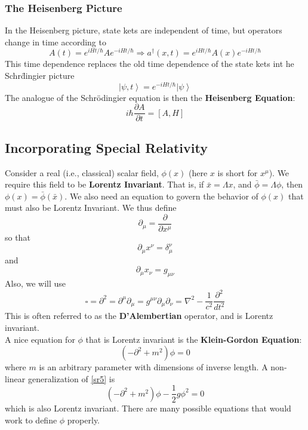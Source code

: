 \documentclass[10pt]{article}
\newcommand{\n}{\noindent}
\newcommand{\ket}[1]{\left|#1\right>}
\newcommand{\comm}[2]{\left[#1,#2\right]}
\begin{document}
	\subsubsection{The Heisenberg Picture}
	In the Heisenberg picture, state kets are independent of time, but operators change in time according to
	\begin{equation}\label{heisenberg1} A(t)=e^{iHt/\hbar}Ae^{-iHt/\hbar} \Rightarrow a^\dag(x,t)=e^{iHt/\hbar}A(x)e^{-iHt/\hbar}\end{equation}
	This time dependence replaces the old time dependence of the state kets int he Schr\"dingier picture
	\begin{equation} \label{heisenberg2}\ket{\psi,t}=e^{-i Ht/\hbar}\ket{\psi}\end{equation}
	The analogue of the Schr\"odingier equation is then the \textbf{Heisenberg Equation}:
	\begin{equation}\label{heisenberg}i\hbar \frac{\partial A}{\partial t}=\comm{A}{H}\end{equation}
	\subsection{Incorporating Special Relativity}
	Consider a real (i.e., classical) scalar field, $\phi(x)$ (here $x$ is short for $x^\mu$). We require this field to be \textbf{Lorentz Invariant}. That is, if $\bar{x}=\Lambda x$, and $\bar{\phi}=\Lambda \phi$, then $\phi(x)=\bar{\phi}(\bar{x})$. We also need an equation to govern the behavior of $\phi(x)$ that must also be Lorentz Invariant. We thus define
	\begin{equation}\label{sr1} \partial_\mu=\frac{\partial}{\partial x^\mu}\end{equation}
	so that
	\begin{equation}\label{sr2} \partial_\mu x^\nu = \delta_\mu^\nu\end{equation}
	and
	\begin{equation} \label{sr3} \partial_\mu x_\nu = g_{\mu\nu}\end{equation}
	Also, we will use
	\begin{equation} \label{sr4} \square = \partial^2 = \partial^\mu\partial_\mu = g^{\mu\nu}\partial_\mu\partial_\nu = \nabla^2-\frac{1}{c^2}\frac{\partial^2}{dt^2}\end{equation}
	This is often referred to as the \textbf{D'Alembertian} operator, and is Lorentz invariant.\\
	
	\n A nice equation for $\phi$ that is Lorentz invariant is the \textbf{Klein-Gordon Equation}:
	\begin{equation} \label{sr5} \boxed{(-\partial^2+m^2)\phi = 0}\end{equation}
	where $m$ is an arbitrary parameter with dimensions of inverse length. A non-linear generalization of \eqref{sr5} is 
	\begin{equation} \label{sr6} (-\partial^2 + m^2)\phi - \frac{1}{2}g\phi^2 = 0\end{equation}
	which is also Lorentz invariant. There are many possible equations that would work to define $\phi$ properly.
\end{document}
